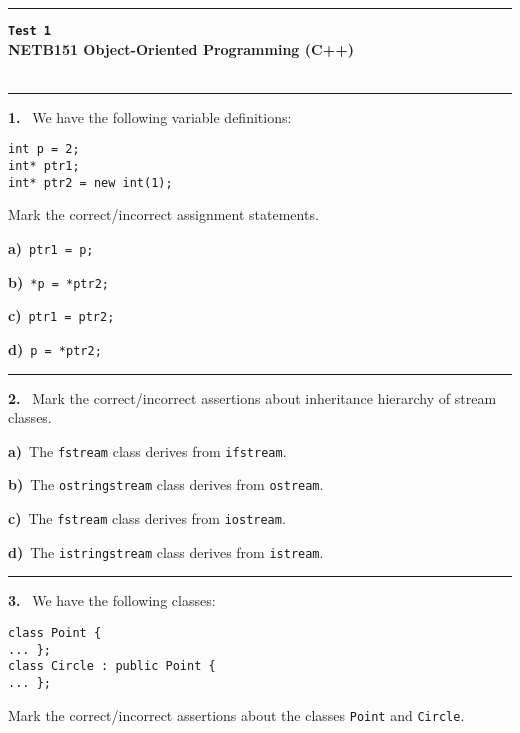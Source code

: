 \newpage\thispagestyle{empty}\par 
\hrule 
\begin{center}
{\bf\large {}}\hfill {\bf\large\verb|Test 1|}
 \hfill{\bf\large {}}\\ 
{\bf\large NETB151 Object-Oriented Programming (C++)}\\[4pt]
{\bf \large {}}\\ 
\end{center}\par
 \vspace{-4mm}
\begin{multicols}{2}
\par\smallskip\hrule\par\medskip

{\bf 1. }\ We have the following variable definitions:
 \vspace{-3mm}\begin{verbatim}
int p = 2;
int* ptr1;
int* ptr2 = new int(1);
 \end{verbatim}\vspace{-6mm}
Mark the correct/incorrect assignment statements.

{\bf a)}\ \verb|ptr1 = p;|

{\bf b)}\ \verb|*p = *ptr2;|

{\bf c)}\ \verb|ptr1 = ptr2;|

{\bf d)}\ \verb|p = *ptr2;|

\par\smallskip\hrule\par\medskip

{\bf 2. }\ Mark the correct/incorrect assertions about inheritance
hierarchy of stream classes.

{\bf a)}\ The \verb|fstream| class derives from \verb|ifstream|.

{\bf b)}\ The \verb|ostringstream| class derives from \verb|ostream|.

{\bf c)}\ The \verb|fstream| class derives from \verb|iostream|.

{\bf d)}\ The \verb|istringstream| class derives from \verb|istream|.

\par\smallskip\hrule\par\medskip

{\bf 3. }\ We have the following classes:
 \vspace{-3mm}\begin{verbatim}
class Point {
... };
class Circle : public Point {
... };
 \end{verbatim}\vspace{-6mm}
Mark the correct/incorrect assertions about the classes
\verb|Point| and \verb|Circle|.


\end{multicols}
